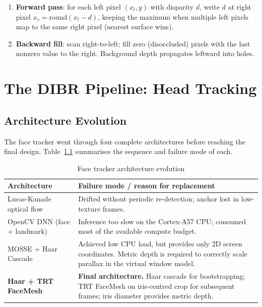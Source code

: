 \documentclass[11pt, a4paper]{report}
\begin{document}
\begin{enumerate}[noitemsep]
    \item \textbf{Forward pass}: for each left pixel $(x_l, y)$ with
          disparity $d$, write $d$ at right pixel
          $x_r = \mathrm{round}(x_l - d)$, keeping the maximum when
          multiple left pixels map to the same right pixel
          (nearest surface wins).
    \item \textbf{Backward fill}: scan right-to-left; fill zero
          (disoccluded) pixels with the last nonzero value to the right.
          Background depth propagates leftward into holes.
\end{enumerate}

\chapter{The DIBR Pipeline: Head Tracking}

\section{Architecture Evolution}

The face tracker went through four complete architectures before reaching
the final design.
Table~\ref{tab:tracker_history} summarises the sequence and failure mode
of each.

\begin{table}[h]
\centering
\caption{Face tracker architecture evolution}
\label{tab:tracker_history}
\begin{tabular}{@{}p{4cm}p{7.5cm}@{}}
\toprule
Architecture & Failure mode / reason for replacement \\
\midrule
Lucas-Kanade optical flow
  & Drifted without periodic re-detection; anchor
    lost in low-texture frames. \\
OpenCV DNN (face + landmark)
  & Inference too slow on the Cortex-A57 CPU;
    consumed most of the available compute budget. \\
MOSSE + Haar Cascade
  & Achieved low CPU load, but provides only 2D
    screen coordinates.
    Metric depth is required to correctly scale
    parallax in the virtual window model. \\
\textbf{Haar + TRT FaceMesh}
  & \textbf{Final architecture.}
    Haar cascade for bootstrapping; TRT FaceMesh
    on iris-centred crop for subsequent frames;
    iris diameter provides metric depth. \\
\bottomrule
\end{tabular}
\end{table}
\end{document}
